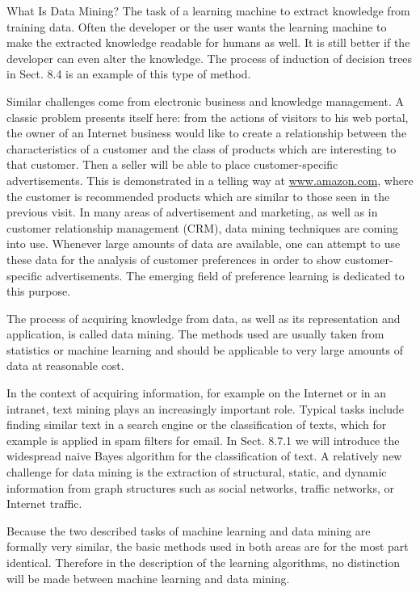 \documentclass[10pt]{article}
\begin{document}
What Is Data Mining? The task of a learning machine to extract knowledge from training data. Often the developer or the user wants the learning machine to make the extracted knowledge readable for humans as well. It is still better if the\\
developer can even alter the knowledge. The process of induction of decision trees in Sect. 8.4 is an example of this type of method.


Similar challenges come from electronic business and knowledge management. A classic problem presents itself here: from the actions of visitors to his web portal, the owner of an Internet business would like to create a relationship between the characteristics of a customer and the class of products which are interesting to that customer. Then a seller will be able to place customer-specific advertisements. This is demonstrated in a telling way at \href{http://www.amazon.com}{www.amazon.com}, where the customer is recommended products which are similar to those seen in the previous visit. In many areas of advertisement and marketing, as well as in customer relationship management (CRM), data mining techniques are coming into use. Whenever large amounts of data are available, one can attempt to use these data for the analysis of customer preferences in order to show customer-specific advertisements. The emerging field of preference learning is dedicated to this purpose.

The process of acquiring knowledge from data, as well as its representation and application, is called data mining. The methods used are usually taken from statistics or machine learning and should be applicable to very large amounts of data at reasonable cost.

In the context of acquiring information, for example on the Internet or in an intranet, text mining plays an increasingly important role. Typical tasks include finding similar text in a search engine or the classification of texts, which for example is applied in spam filters for email. In Sect. 8.7.1 we will introduce the widespread naive Bayes algorithm for the classification of text. A relatively new challenge for data mining is the extraction of structural, static, and dynamic information from graph structures such as social networks, traffic networks, or Internet traffic.

Because the two described tasks of machine learning and data mining are formally very similar, the basic methods used in both areas are for the most part identical. Therefore in the description of the learning algorithms, no distinction will be made between machine learning and data mining.
\end{document}
